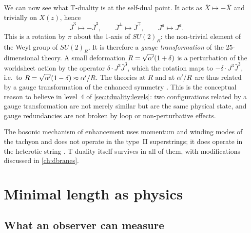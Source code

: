 We can now see what T-duality is at the self-dual point. It acts as $\bar X\mapsto-\bar X$ and
trivially on $X(z)$, hence
\begin{equation}\label{eq:tduality:weyl}
  \bar J^3\longmapsto-\bar J^3,\qquad\bar J^\pm\longmapsto\bar J^\mp,\qquad J^a\longmapsto J^a .
\end{equation}
This is a rotation by $\pi$ about the $1$-axis of $SU(2)_R$: the non-trivial element of the Weyl
group of $SU(2)_R$. It is therefore a \emph{gauge transformation} of the
25-dimensional theory. A small deformation $R=\sqrt{\alpha'}(1+\delta)$ is a perturbation of the
worldsheet action by the operator $\delta\cdot J^3\bar J^3$, which the rotation maps to
$-\delta\cdot J^3\bar J^3$, i.e.\ to $R=\sqrt{\alpha'}(1-\delta)\approx\alpha'/R$. The theories at $R$ and
at $\alpha'/R$ are thus related by a gauge transformation of the enhanced symmetry
. This is the conceptual reason to believe in level~4 of
\cref{sec:tduality:levels}: two configurations related by a gauge transformation are not merely
similar but are the same physical state, and gauge redundancies are not broken by loop or
non-perturbative effects.

\begin{remark}
The bosonic mechanism of enhancement uses momentum and winding modes of the tachyon and
does not operate in the type~II superstrings; it does operate in the heterotic string
. T-duality itself survives in all of them, with
modifications discussed in \cref{ch:dbranes}.
\end{remark}

\section{Minimal length as physics}\label{sec:tduality:minlength}

\subsection{What an observer can measure}

